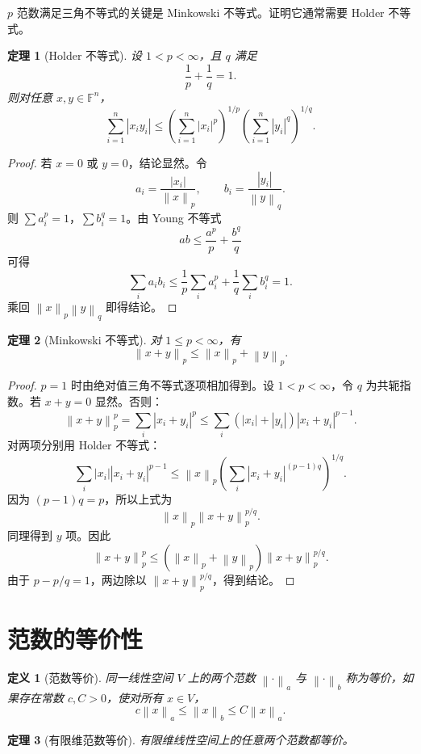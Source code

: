 \documentclass[UTF8,openany,zihao=-4]{ctexbook}
\theoremstyle{cnplain}
\newtheorem{definition}{定义}[chapter]
\newtheorem{theorem}{定理}[chapter]
\newcommand{\F}{\mathbb F}
\newcommand{\norm}[1]{\left\lVert #1\right\rVert}
\newcommand{\abs}[1]{\left\lvert #1\right\rvert}
\begin{document}
$p$ 范数满足三角不等式的关键是 Minkowski 不等式。证明它通常需要 Holder 不等式。

\begin{theorem}[Holder 不等式]
设 $1<p<\infty$，且 $q$ 满足
\[
\frac1p+\frac1q=1.
\]
则对任意 $x,y\in\F^n$，
\[
\sum_{i=1}^n\abs{x_i y_i}
\le
\left(\sum_{i=1}^n\abs{x_i}^p\right)^{1/p}
\left(\sum_{i=1}^n\abs{y_i}^q\right)^{1/q}.
\]
\end{theorem}

\begin{proof}
若 $x=0$ 或 $y=0$，结论显然。令
\[
a_i=\frac{\abs{x_i}}{\norm{x}_p},
\qquad
b_i=\frac{\abs{y_i}}{\norm{y}_q}.
\]
则 $\sum a_i^p=1$，$\sum b_i^q=1$。由 Young 不等式
\[
ab\le \frac{a^p}{p}+\frac{b^q}{q}
\]
可得
\[
\sum_i a_i b_i\le \frac1p\sum_i a_i^p+\frac1q\sum_i b_i^q=1.
\]
乘回 $\norm{x}_p\norm{y}_q$ 即得结论。
\end{proof}

\begin{theorem}[Minkowski 不等式]
对 $1\le p<\infty$，有
\[
\norm{x+y}_p\le\norm{x}_p+
\norm{y}_p.
\]
\end{theorem}

\begin{proof}
$p=1$ 时由绝对值三角不等式逐项相加得到。设 $1<p<\infty$，令 $q$ 为共轭指数。若 $x+y=0$ 显然。否则：
\[
\norm{x+y}_p^p
=\sum_i \abs{x_i+y_i}^p
\le \sum_i (\abs{x_i}+\abs{y_i})\abs{x_i+y_i}^{p-1}.
\]
对两项分别用 Holder 不等式：
\[
\sum_i \abs{x_i}\abs{x_i+y_i}^{p-1}
\le \norm{x}_p
\left(\sum_i \abs{x_i+y_i}^{(p-1)q}\right)^{1/q}.
\]
因为 $(p-1)q=p$，所以上式为
\[
\norm{x}_p\norm{x+y}_p^{p/q}.
\]
同理得到 $y$ 项。因此
\[
\norm{x+y}_p^p
\le (\norm{x}_p+\norm{y}_p)\norm{x+y}_p^{p/q}.
\]
由于 $p-p/q=1$，两边除以 $\norm{x+y}_p^{p/q}$，得到结论。
\end{proof}

\section{范数的等价性}

\begin{definition}[范数等价]
同一线性空间 $V$ 上的两个范数 $\norm{\cdot}_a$ 与 $\norm{\cdot}_b$ 称为等价，如果存在常数 $c,C>0$，使对所有 $x\in V$，
\[
c\norm{x}_a\le\norm{x}_b\le C\norm{x}_a.
\]
\end{definition}

\begin{theorem}[有限维范数等价]
有限维线性空间上的任意两个范数都等价。
\end{theorem}
\end{document}
